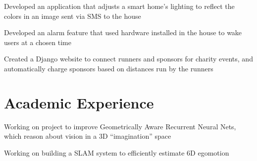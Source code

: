 \documentclass[letterpaper]{deedy-resume} %
\begin{document}
\begin{minipage}[t]{0.66\textwidth}


\begin{tightitemize}
    \item Developed an application that adjusts a smart home's lighting to reflect the colors in an image sent via SMS to the house
    \item Developed an alarm feature that used hardware installed in the house to wake users at a chosen time
\end{tightitemize}

\sectionspace %


\begin{tightitemize}
    \item Created a Django website to connect runners and sponsors for charity events, and automatically charge sponsors based on distances run by the runners
\end{tightitemize}

\sectionspace %


\section{Academic Experience}


\begin{tightitemize}
  \item Working on project to improve Geometrically Aware Recurrent Neural Nets, which reason about vision in a 3D ``imagination'' space
  \item Working on building a SLAM system to efficiently estimate 6D egomotion
\end{tightitemize}


\end{minipage}
\end{document}
